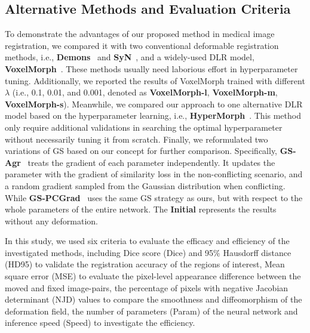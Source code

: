 \documentclass[runningheads]{llncs}
\begin{document}
\subsection{Alternative Methods and Evaluation Criteria}
To demonstrate the advantages of our proposed method in medical image registration, we compared it with two conventional deformable registration methods, i.e., \textbf{Demons}~\cite{vercauteren2009diffeomorphic} and \textbf{SyN}~\cite{avants2008symmetric}, and a widely-used DLR model, \textbf{VoxelMorph}~\cite{dalca2018unsupervised}. These methods usually need laborious effort in hyperparameter tuning. Additionally, we reported the results of VoxelMorph trained with different $\lambda$ (i.e., 0.1, 0.01, and 0.001, denoted as \textbf{VoxelMorph-l}, \textbf{VoxelMorph-m}, \textbf{VoxelMorph-s}). Meanwhile, we compared our approach to one alternative DLR model based on the hyperparameter learning, i.e., \textbf{HyperMorph}~\cite{hoopes2021hypermorph}. This method only require additional validations in searching the optimal hyperparameter without necessarily tuning it from scratch. Finally, we reformulated two variations of GS based on our concept for further comparison. Specifically, \textbf{GS-Agr}~\cite{mansilla2021domain} treats the gradient of each parameter independently. It updates the parameter with the gradient of similarity loss in the non-conflicting scenario, and a random gradient sampled from the Gaussian distribution when conflicting. While \textbf{GS-PCGrad}~\cite{yu2020gradient} uses the same GS strategy as ours, but with respect to the whole parameters of the entire network. The \textbf{Initial} represents the results without any deformation.

In this study, we used six criteria to evaluate the efficacy and efficiency of the investigated methods, including Dice score (Dice) and 95$\%$ Hausdorff distance (HD95) to validate the registration accuracy of the regions of interest, Mean square error (MSE) to evaluate the pixel-level appearance difference between the moved and fixed image-pairs, the percentage of pixels with negative Jacobian determinant (NJD) values to compare the smoothness and diffeomorphism of the deformation field, the number of parameters (Param) of the neural network and inference speed (Speed) to investigate the efficiency.
\end{document}

